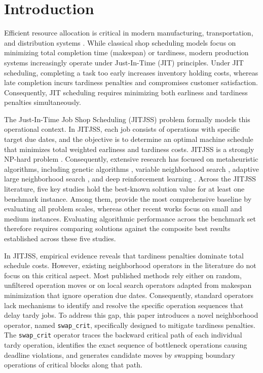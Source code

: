 \section{Introduction}
\label{sec:introduction}

Efficient resource allocation is critical in modern manufacturing, transportation, and distribution systems \citep{pinedo2016}.
While classical shop scheduling models focus on minimizing total completion time (makespan) or tardiness, modern production systems increasingly operate under Just-In-Time (JIT) principles.
Under JIT scheduling, completing a task too early increases inventory holding costs, whereas late completion incurs tardiness penalties and compromises customer satisfaction.
Consequently, JIT scheduling requires minimizing both earliness and tardiness penalties simultaneously.

The Just-In-Time Job Shop Scheduling (JITJSS) problem \citep{baptiste2008lagrangian} formally models this operational context.
In JITJSS, each job consists of operations with specific target due dates, and the objective is to determine an optimal machine schedule that minimizes total weighted earliness and tardiness costs.
JITJSS is a strongly NP-hard problem \citep{du1990minimizing}.
Consequently, extensive research has focused on metaheuristic algorithms, including genetic algorithms \citep{araujo2009genetic, dos2010combination, yang2012improved}, variable neighborhood search \citep{wang2014variable, ahmadian2021meta}, adaptive large neighborhood search \citep{laborie2007self, abderrazzak2022adaptive}, and deep reinforcement learning \citep{sabri2023reinforcement}.
Across the JITJSS literature, five key studies \citep{dos2010combination, wang2014variable, ahmadian2021meta, abderrazzak2022adaptive, sabri2023reinforcement} hold the best-known solution value for at least one benchmark instance.
Among them, \citet{ahmadian2021meta} provide the most comprehensive baseline by evaluating all problem scales, whereas other recent works \citep{abderrazzak2022adaptive, sabri2023reinforcement} focus on small and medium instances.
Evaluating algorithmic performance across the benchmark set therefore requires comparing solutions against the composite best results established across these five studies.

In JITJSS, empirical evidence reveals that tardiness penalties dominate total schedule costs.
However, existing neighborhood operators in the literature do not focus on this critical aspect.
Most published methods rely either on random, unfiltered operation moves \citep{dos2010combination, ahmadian2021meta} or on local search operators adapted from makespan minimization that ignore operation due dates.
Consequently, standard operators lack mechanisms to identify and resolve the specific operation sequences that delay tardy jobs.
To address this gap, this paper introduces a novel neighborhood operator, named \texttt{swap\_crit}, specifically designed to mitigate tardiness penalties.
The \texttt{swap\_crit} operator traces the backward critical path of each individual tardy operation, identifies the exact sequence of bottleneck operations causing deadline violations, and generates candidate moves by swapping boundary operations of critical blocks along that path.

